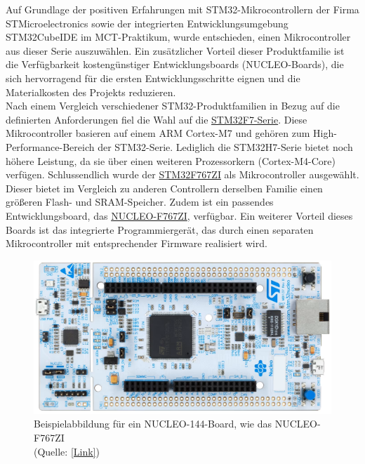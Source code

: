 \documentclass[a4paper, portrait, 12pt]{scrartcl} %
\begin{document}
Auf Grundlage der positiven Erfahrungen mit STM32-Mikrocontrollern der Firma STMicroelectronics sowie der integrierten Entwicklungsumgebung STM32CubeIDE im MCT-Praktikum, wurde entschieden, einen Mikrocontroller aus dieser Serie auszuwählen. Ein zusätzlicher Vorteil dieser Produktfamilie ist die Verfügbarkeit kostengünstiger Entwicklungsboards (NUCLEO-Boards), die sich hervorragend für die ersten Entwicklungsschritte eignen und die Materialkosten des Projekts reduzieren.\\

Nach einem Vergleich verschiedener STM32-Produktfamilien in Bezug auf die definierten Anforderungen fiel die Wahl auf die \href{https://www.st.com/en/microcontrollers-microprocessors/stm32f7-series.html}{STM32F7-Serie}. Diese Mikrocontroller basieren auf einem ARM Cortex-M7 und gehören zum High-Performance-Bereich der STM32-Serie. Lediglich die STM32H7-Serie bietet noch höhere Leistung, da sie über einen weiteren Prozessorkern (Cortex-M4-Core) verfügen. Schlussendlich wurde der \href{https://www.st.com/en/microcontrollers-microprocessors/stm32f767zi.html}{STM32F767ZI} als Mikrocontroller ausgewählt. Dieser bietet im Vergleich zu anderen Controllern derselben Familie einen größeren Flash- und SRAM-Speicher. Zudem ist ein passendes Entwicklungsboard, das \href{https://www.st.com/en/evaluation-tools/nucleo-f767zi.html}{NUCLEO-F767ZI}, verfügbar. Ein weiterer Vorteil dieses Boards ist das integrierte Programmiergerät, das durch einen separaten Mikrocontroller mit entsprechender Firmware realisiert wird.\\

\begin{figure}[H]
	\centering
    \includegraphics[scale=0.2]{nucleof767zi.png} 
	\caption{\centering Beispielabbildung für ein NUCLEO-144-Board, wie das NUCLEO-F767ZI\\ (Quelle: \href{https://www.st.com/en/evaluation-tools/nucleo-f767zi.html}{[Link]})}
	\label{fig:nucleo144}
\end{figure}
\end{document}
